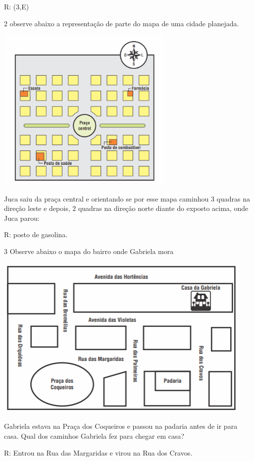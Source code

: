 R: (3,E)

\num{2}  observe abaixo a representação de parte do mapa de uma cidade
planejada.

\includegraphics[width=3.39535in,height=3.14326in]{./imgSAEB_6_MAT/media/image65.png}

Juca saiu da praça central e orientando se por esse mapa caminhou $3$
quadras na direção leste e depois, $2$ quadras na direção norte diante do
exposto acima, onde Juca parou:

R: posto de gasolina.

\num{3}  Observe abaixo o mapa do bairro onde Gabriela mora

\includegraphics[width=4.95347in,height=3.13958in]{./imgSAEB_6_MAT/media/image66.png}

Gabriela estava na Praça dos Coqueiros e passou na padaria antes de ir
para casa. Qual dos caminhos Gabriela fez para chegar em casa?

R: Entrou na Rua das Margaridas e virou na Rua dos Cravos.

